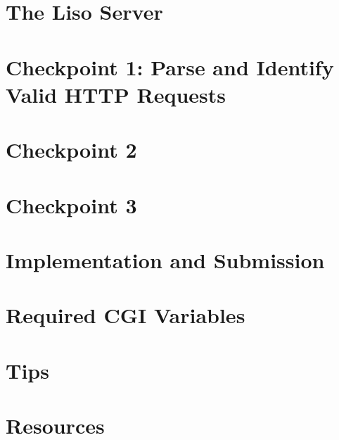 \documentclass{article}
\begin{document}
\newpage
\section{The Liso Server}


\newpage
\section{Checkpoint 1: Parse and Identify Valid HTTP Requests}


\newpage
\section{Checkpoint 2}


\newpage
\section{Checkpoint 3}


\newpage
\section{Implementation and Submission}
\label{sec:impl}


\appendix

\newpage
\section{Required CGI Variables}


\newpage
\section{Tips}


\newpage
\section{Resources}


\newpage

\end{document}
